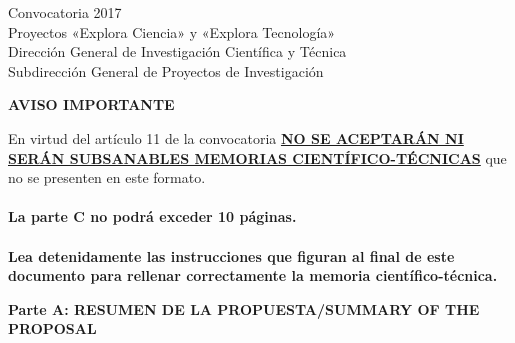 \documentclass[a4paper,11pt,oneside]{article}
\begin{document}


\begin{center}
\begin{tcolorbox}[width=12cm, colback=white,arc=0pt,outer arc=0pt,colframe=black,boxrule=0.6pt]
\centering
Convocatoria 2017\\
Proyectos «Explora Ciencia» y «Explora Tecnolog\'ia» \\
Direcci\'on General de Investigaci\'on Cient\'ifica y T\'ecnica\\
Subdirecci\'on General de Proyectos de Investigaci\'on

%
\end{tcolorbox}
\end{center} 

\begin{tcolorbox}[width=16.7cm,colback=yellow,arc=0pt,outer arc=0pt,colframe=black,boxrule=0.6pt,left=0mm,right=0mm, boxsep=2mm, bottom=1mm]
  \begin{center}
    \textbf{AVISO IMPORTANTE}
  \end{center}

\vspace{0.5cm}
En virtud del art\'iculo 11 de la convocatoria \ul{\textbf{NO SE ACEPTAR\'AN NI SER\'AN SUBSANABLES MEMORIAS CIENT\'IFICO-T\'ECNICAS}} que no se presenten en este formato.
     \\
     \\
    \textbf{La parte C no podrá exceder 10 p\'aginas.}
    \\
    \\
    \textbf{Lea detenidamente las instrucciones que figuran al final de este documento para rellenar correctamente la memoria cient\'ifico-t\'ecnica.}
\end{tcolorbox}
\vspace{3pt}
\begin{tcolorbox}[width=14.5cm,colback=yellow,arc=0pt,outer arc=0pt,colframe=black,boxrule=0.6pt,left=0mm, boxsep=2mm]
  \noindent\textbf{Parte A: RESUMEN DE LA PROPUESTA/SUMMARY OF THE PROPOSAL}
\end{tcolorbox}
\end{document}
